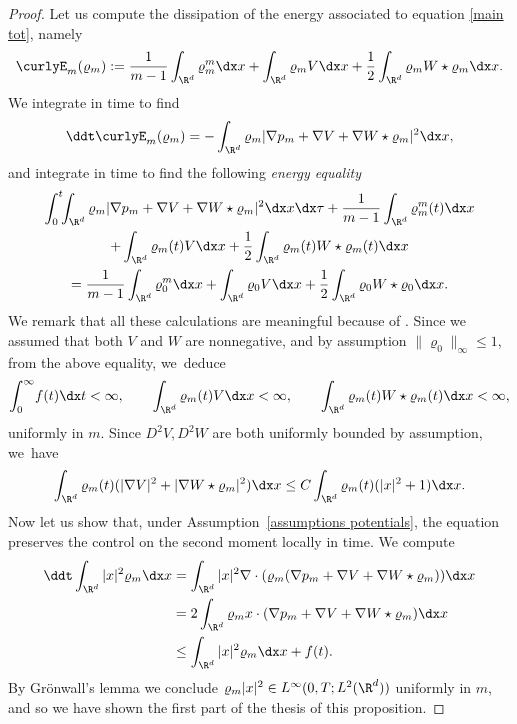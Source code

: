 \begin{proof}
Let us compute the dissipation of the energy associated to equation \eqref{main tot}, namely
\begin{equation*}
\curlyE_m(\varrho_m) := \frac{1}{m-1}\int_{\R^d}\varrho_m^{{m}} \dx x + \int_{\R^d} \varrho_m V \dx x + \frac 12 \int_{\R^d}\varrho_m W\star \varrho_m \dx x.
\end{equation*}
We integrate in time to find
\begin{equation*}
\ddt \curlyE_m(\varrho_m) = - \int_{\R^d} \varrho_m |\nabla p_m +\nabla V + \nabla W \star \varrho_m|^2 \dx x,
\end{equation*}
and integrate in time to find the following \textit{energy equality}
\begin{multline*}\label{energy equality}
\int_0^t\!\! \int_{\R^d} \varrho_m |\nabla p_m + \nabla V + \nabla W\star \varrho_m|^2 \dx x \dx \tau + \frac{1}{m-1}\int_{\R^d} \varrho_m^m(t) \dx x\\
+\int_{\R^d} \varrho_m(t) V \dx x +\frac 12\int_{\R^d} \varrho_m(t) W\star\varrho_m(t)\dx x \\
= \frac{1}{m-1}\int_{\R^d} \varrho_0^m \dx x+\int_{\R^d}\varrho_0 V \dx x +\frac 12\int_{\R^d} \varrho_0 W\star\varrho_0\dx x.
\end{multline*}
We remark that all these calculations are meaningful because of \cite[Th.\,11.2.8]{AGS2008}. Since we assumed that both $V$ and $W$ are nonnegative, and by assumption $\|\varrho_0\|_\infty\leq 1$, from the above equality, we~deduce
\begin{equation}\label{eq: f in L1}
\int^\infty_0 \! f(t) \dx t < \infty, \qquad \int_{\R^d} \varrho_m (t) V \dx x < \infty, \qquad \int_{\R^d} \varrho_m(t) W\star\varrho_m(t)\dx x <\infty,
\end{equation}
uniformly in $m$.
Since $D^2V, D^2W$ are both uniformly bounded by assumption, we~have
\begin{equation}\label{control with m2}
\int_{\R^d} \varrho_m(t) (|\nabla V|^2 + |\nabla W\star \varrho_m|^2) \dx x\leq C \int_{\R^d} \varrho_m(t) (|x|^2+1)\dx x.
\end{equation}
Now let us show that, under Assumption~\ref{assumptions potentials}, the equation preserves the control on the second moment locally in time.
We compute
\begin{align*}
\ddt \int_{\R^d} |x|^2 \varrho_m \dx x &= \int_{\R^d} |x|^2 \nabla\cdot(\varrho_m (\nabla p_m + \nabla V + \nabla W\star \varrho_m)) \dx x\\
&= {2} \int_{\R^d} \varrho_m x \cdot (\nabla p_m + \nabla V + \nabla W\star \varrho_m)\dx x\\
&\leq {\int_{\R^d} |x|^2 \varrho_m\dx x + f(t)}.
\end{align*}
By Grönwall's lemma we conclude $\varrho_m |x|^2 \in L^{\infty}(0,T; L^2(\R^d))$ uniformly in $m$, and so we have shown the first part of the thesis of this proposition.


\end{proof}
